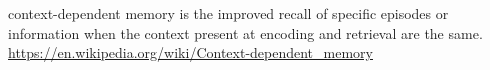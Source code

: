 \documentclass[a4paper]{article}
\title{}
\date{}
\begin{document}
    \maketitle
    context-dependent memory is the improved recall of specific episodes or information when the context present at encoding and retrieval are the same. \url{https://en.wikipedia.org/wiki/Context-dependent_memory}
\end{document}
